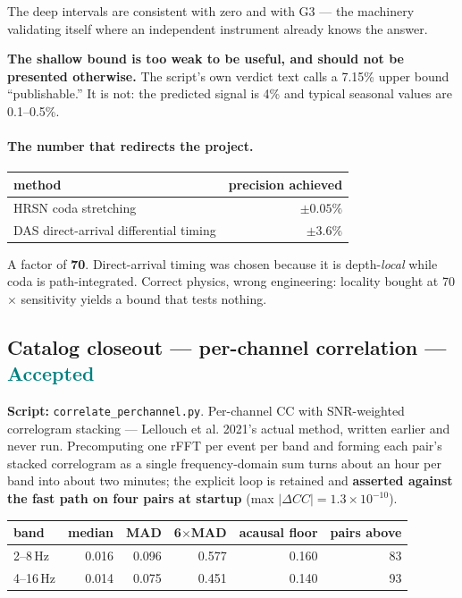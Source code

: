 \documentclass[11pt]{article}
\newcommand{\accepted}{\textcolor{teal}{\textbf{Accepted}}}
\begin{document}
The deep intervals are consistent with zero and with G3 --- the machinery
validating itself where an independent instrument already knows the answer.

\textbf{The shallow bound is too weak to be useful, and should not be presented
otherwise.} The script's own verdict text calls a 7.15\% upper bound
``publishable.'' It is not: the predicted signal is 4\% and typical seasonal values
are 0.1--0.5\%.

\paragraph{The number that redirects the project.}

\begin{table}[H]
\centering
\begin{tabular}{lr}
\toprule
method & precision achieved \\
\midrule
HRSN coda stretching & $\pm0.05\%$ \\
DAS direct-arrival differential timing & $\pm3.6\%$ \\
\bottomrule
\end{tabular}
\end{table}

A factor of \textbf{70}. Direct-arrival timing was chosen because it is
depth-\emph{local} while coda is path-integrated. Correct physics, wrong
engineering: locality bought at 70$\times$ sensitivity yields a bound that tests
nothing.

\subsection{Catalog closeout --- per-channel correlation --- \accepted}

\textbf{Script:} \texttt{correlate\_perchannel.py}. Per-channel CC with
SNR-weighted correlogram stacking --- Lellouch et al. 2021's actual method, written
earlier and never run. Precomputing one rFFT per event per band and forming each
pair's stacked correlogram as a single frequency-domain sum turns about an hour per
band into about two minutes; the explicit loop is retained and \textbf{asserted
against the fast path on four pairs at startup} (max $|\Delta CC| = 1.3\times
10^{-10}$).

\begin{table}[H]
\centering
\begin{tabular}{lrrrrr}
\toprule
band & median & MAD & 6$\times$MAD & acausal floor & pairs above \\
\midrule
2--8\,Hz & 0.016 & 0.096 & 0.577 & 0.160 & 83 \\
4--16\,Hz & 0.014 & 0.075 & 0.451 & 0.140 & 93 \\
\bottomrule
\end{tabular}
\end{table}
\end{document}
